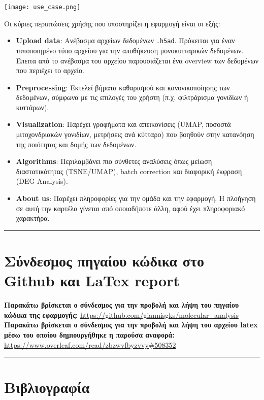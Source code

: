 \documentclass{article}  %
\begin{document}
\noindent
\begin{minipage}[t]{0.5\textwidth}
\vspace{0pt}
\texttt{[image: use\_case.png]}
\end{minipage}%
\hfill
\begin{minipage}[t]{0.5\textwidth}
\vspace{0pt}

Οι κύριες περιπτώσεις χρήσης που υποστηρίζει η εφαρμογή είναι οι εξής:

\begin{itemize}
    \item \textbf{Upload data}: Ανέβασμα αρχείων δεδομένων \texttt{.h5ad}. Πρόκειται για έναν τυποποιημένο τύπο αρχείου για την αποθήκευση μονοκυτταρικών δεδομένων. Έπειτα από το ανέβασμα του αρχείου παρουσιάζεται ένα overview των δεδομένων που περιέχει το αρχείο.
    \item \textbf{Preprocessing}: Εκτελεί βήματα καθαρισμού και κανονικοποίησης των δεδομένων, σύμφωνα με τις επιλογές του χρήστη (π.χ. φιλτράρισμα γονιδίων ή κυττάρων).
    \item \textbf{Visualization}: Παρέχει γραφήματα και απεικονίσεις (UMAP, ποσοστά μιτοχονδριακών γονιδίων, μετρήσεις ανά κύτταρο) που βοηθούν στην κατανόηση της ποιότητας και δομής των δεδομένων.
    \item \textbf{Algorithms}: Περιλαμβάνει πιο σύνθετες αναλύσεις όπως μείωση διαστατικότητας (TSNE/UMAP), batch correction και διαφορική έκφραση (DEG Analysis).
    \item \textbf{About us}: Παρέχει πληροφορίες για την ομάδα και την εφαρμογή. Η πλοήγηση σε αυτή την καρτέλα γίνεται από οποιαδήποτε άλλη, αφού έχει πληροφοριακό χαρακτήρα.
\end{itemize}
\end{minipage}

\noindent\rule{\linewidth}{0.4pt}

\section{Σύνδεσμος πηγαίου κώδικα στο Github και LaTex report}

\textbf{Παρακάτω βρίσκεται ο σύνδεσμος για την προβολή και λήψη του πηγαίου κώδικα της εφαρμογής:}
\newline
\url{https://github.com/giannisgks/molecular_analysis}\\

\noindent\textbf{Παρακάτω βρίσκεται ο σύνδεσμος για την προβολή και λήψη του αρχείου latex μέσω του οποίου δημιουργήθηκε η παρούσα αναφορά:}
\newline
\url{https://www.overleaf.com/read/zbzwvfbyzvvy#508352}

\noindent\rule{\linewidth}{0.4pt}
\section{Βιβλιογραφία}
\printbibliography
\end{document}
